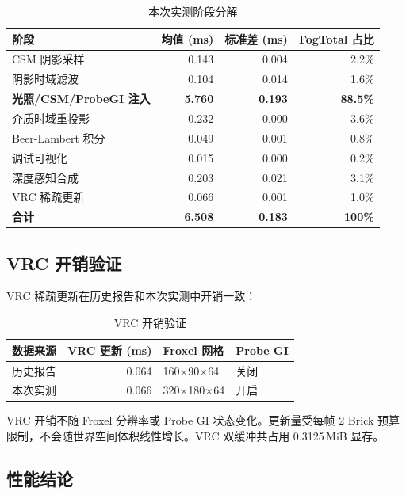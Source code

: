 \documentclass[11pt,a4paper]{article}
\begin{document}
\begin{table}[H]
\centering
\begin{tabular}{lrrr}
\toprule
阶段 & 均值 (ms) & 标准差 (ms) & FogTotal 占比 \\
\midrule
CSM 阴影采样 & 0.143 & 0.004 & 2.2\% \\
阴影时域滤波 & 0.104 & 0.014 & 1.6\% \\
\textbf{光照/CSM/ProbeGI 注入} & \textbf{5.760} & \textbf{0.193} & \textbf{88.5\%} \\
介质时域重投影 & 0.232 & 0.000 & 3.6\% \\
Beer-Lambert 积分 & 0.049 & 0.001 & 0.8\% \\
调试可视化 & 0.015 & 0.000 & 0.2\% \\
深度感知合成 & 0.203 & 0.021 & 3.1\% \\
VRC 稀疏更新 & 0.066 & 0.001 & 1.0\% \\
\midrule
\textbf{合计} & \textbf{6.508} & \textbf{0.183} & \textbf{100\%} \\
\bottomrule
\end{tabular}
\caption{本次实测阶段分解}
\end{table}

\subsection{VRC 开销验证}

VRC 稀疏更新在历史报告和本次实测中开销一致：

\begin{table}[H]
\centering
\begin{tabular}{lrll}
\toprule
数据来源 & VRC 更新 (ms) & Froxel 网格 & Probe GI \\
\midrule
历史报告 & 0.064 & 160$\times$90$\times$64 & 关闭 \\
本次实测 & 0.066 & 320$\times$180$\times$64 & 开启 \\
\bottomrule
\end{tabular}
\caption{VRC 开销验证}
\end{table}

VRC 开销不随 Froxel 分辨率或 Probe GI 状态变化。更新量受每帧 2 Brick 预算限制，不会随世界空间体积线性增长。VRC 双缓冲共占用 0.3125\,MiB 显存。

\subsection{性能结论}
\end{document}
